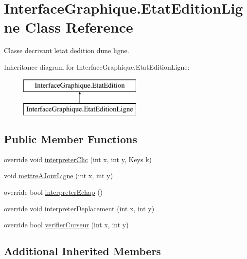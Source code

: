 \hypertarget{class_interface_graphique_1_1_etat_edition_ligne}{}\section{Interface\+Graphique.\+Etat\+Edition\+Ligne Class Reference}
\label{class_interface_graphique_1_1_etat_edition_ligne}


Classe decrivant l\textquotesingle{}etat d\textquotesingle{}edition d\textquotesingle{}une ligne.  


Inheritance diagram for Interface\+Graphique.\+Etat\+Edition\+Ligne\+:\begin{figure}[H]
\begin{center}
\leavevmode
\includegraphics[height=2.000000cm]{class_interface_graphique_1_1_etat_edition_ligne}
\end{center}
\end{figure}
\subsection*{Public Member Functions}
\begin{DoxyCompactItemize}
\item 
override void \hyperlink{group__inf2990_ga8c2be724327977a66650e6987423b95d}{interpreter\+Clic} (int x, int y, Keys k)
\item 
void \hyperlink{group__inf2990_ga208ebe152302ec750de1485e0589b34f}{mettre\+A\+Jour\+Ligne} (int x, int y)
\item 
override bool \hyperlink{group__inf2990_ga77ffb80cb55a5ef9c31c3ebebcf3db16}{interpreter\+Echap} ()
\item 
override void \hyperlink{group__inf2990_gac11a3b90a64b159ac00c59d2fcb349d8}{interpreter\+Deplacement} (int x, int y)
\item 
override bool \hyperlink{group__inf2990_ga8a77b3328fecc3fd3ce738abc6606b1e}{verifier\+Curseur} (int x, int y)
\end{DoxyCompactItemize}
\subsection*{Additional Inherited Members}


